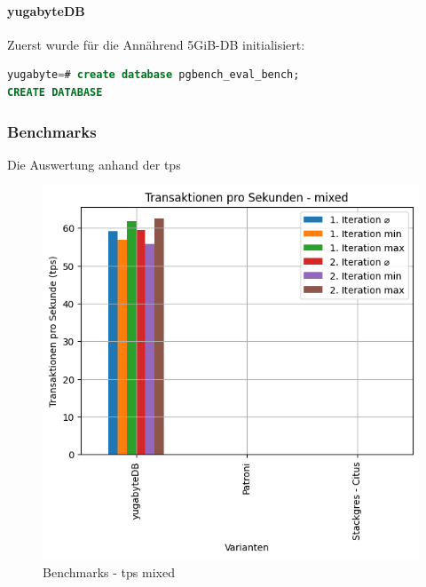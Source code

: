 
\begin{flushleft}
    \paragraph{yugabyteDB}
    Zuerst wurde für die Annährend 5GiB-DB initialisiert:
\lstset{style=gra_codestyle}
\begin{lstlisting}[language=sql, caption=yugabyteDB - Benchmarking - DB erstellen,captionpos=b,label={lst:yugabytedb-benchmarking-create-db},breaklines=true]
yugabyte=# create database pgbench_eval_bench;
CREATE DATABASE
\end{lstlisting}


    \subsubsection{Benchmarks}
    Die Auswertung anhand der tps
    \begin{figure}[H]
        \centering
        \includegraphics[width=1\linewidth]{source/pandas_data_chart_plotter/tps_mixed}
        \caption{Benchmarks - tps mixed}
        \label{fig:tps_mixed}
    \end{figure}


\end{flushleft}
